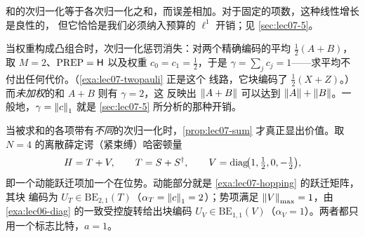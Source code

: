 和的次归一化等于各次归一化之和，而误差相加。对于固定的项数，这种线性增长是良性的，
但它恰恰是我们必须纳入预算的 $\ell^1$ 开销；见 \cref{sec:lec07-5}。

\begin{remark}[凸权重不产生次归一化]
\label{rem:lec07-average}
当权重构成凸组合时，次归一化惩罚消失：对两个精确编码的平均 $\tfrac12(A+B)$，取
$M=2$、$\mathrm{PREP}=\mathsf{H}$ 以及权重 $c_0=c_1=\tfrac12$，于是
$\gamma=\sum_j c_j=1$——求平均不付出任何代价。（\cref{exa:lec07-twopauli} 正是这个
线路，它块编码了 $\tfrac12(X+Z)$。）而\emph{未加权}的和 $A+B$ 则有 $\gamma=2$，这
反映出 $\left\lVert A+B \right\rVert$ 可以达到 $\left\lVert A \right\rVert+\left\lVert B \right\rVert$。一般地，$\gamma=\left\lVert c \right\rVert_1$ 就是
\cref{sec:lec07-5} 所分析的那种开销。
\end{remark}

\begin{example}[块编码紧束缚哈密顿量 $H=T+V$]
\label{exa:lec07-tightbinding}
当被求和的各项带有\emph{不同}的次归一化时，\cref{prop:lec07-sum} 才真正显出价值。取
$N=4$ 的离散薛定谔（紧束缚）哈密顿量
\[
  H=T+V,\qquad T=S+S^{\dagger},\qquad V=\operatorname{diag}\!\bigl(1,\tfrac12,0,-\tfrac12\bigr),
\]
即一个动能跃迁项加一个在位势。动能部分就是 \cref{exa:lec07-hopping} 的跃迁矩阵，其块
编码为 $U_T\in\mathrm{BE}_{2,1}(T)$（$\alpha_T=\left\lVert c \right\rVert_1=2$）；势项满足
$\left\lVert V \right\rVert_{\max}=1$，由 \cref{exa:lec06-diag} 的一致受控旋转给出块编码
$U_V\in\mathrm{BE}_{1,1}(V)$（$\alpha_V=1$）。两者都只用一个标志比特，$a=1$。


\end{example}

